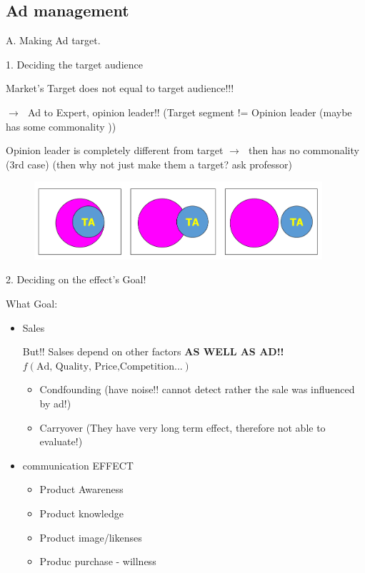 \documentclass[12pt]{article}
\newcommand{\ra}{$\rightarrow \text{ }$}
\begin{document}
\begin{itemize}
\section{Ad management}

A. Making Ad target.


1.
Deciding the target audience

	Market's Target does not equal to target audience!!!

	\ra Ad to Expert, opinion leader!! (Target segment != Opinion leader (maybe has some commonality ))


	Opinion leader is completely different from target \ra then has no commonality (3rd case) (then why not just make them a target? ask professor)
	\begin{figure}[H]
	\centering
	\includegraphics[width=0.95\textwidth]{img/POM_3-d3b007c3.png}
	\caption{}
	\label{}
\end{figure}

2.
Deciding on the effect's Goal!

What Goal:

\begin{itemize}
	\item Sales

	But!! Salses depend on other factors \textbf{AS WELL AS AD!!} ~ $f(\text{Ad, Quality, Price,Competition...}) $

	\begin{itemize}
		\item Condfounding (have noise!! cannot detect rather the sale was influenced by ad!)
		\item Carryover (They have very long term effect, therefore not able to evaluate!)
	\end{itemize}
	\item communication EFFECT
	\begin{itemize}
		\item Product Awareness
		\item Product knowledge
		\item Product image/likenses
		\item Produc purchase - willness
	\end{itemize}
\end{itemize}


\end{itemize}
\end{document}
